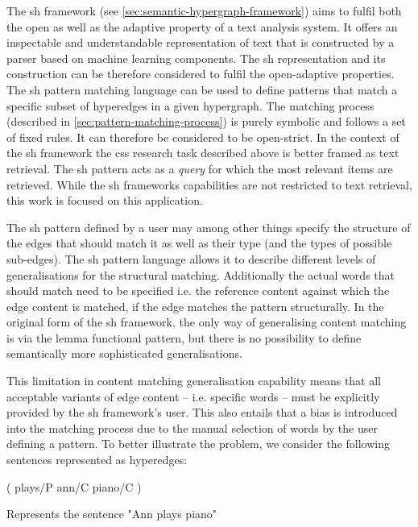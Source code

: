 \documentclass[11pt, numbers=noenddot]{scrreprt}
\begin{document}
The \gls{sh} framework (see \cref{sec:semantic-hypergraph-framework}) aims to fulfil both the open as well as the adaptive property of a text analysis system. It offers an inspectable and understandable representation of text that is constructed by a parser based on machine learning components. The \gls{sh} representation and its construction can be therefore considered to fulfil the open-adaptive properties. The \gls{sh} pattern matching language can be used to define patterns that match a specific subset of hyperedges in a given hypergraph. The matching process (described in \cref{sec:pattern-matching-process}) is purely symbolic and follows a set of fixed rules. It can therefore be considered to be open-strict. In the context of the \gls{sh} framework the \gls{css} research task described above is better framed as text retrieval. The \gls{sh} pattern acts  as a \textit{query} for which the most relevant items are retrieved. While the \gls{sh} frameworks capabilities are not restricted to text retrieval, this work is focused on this application.

The \gls{sh} pattern defined by a user may among other things specify the structure of the edges that should match it as well as their type (and the types of possible sub-edges). The \gls{sh} pattern language allows it to describe different levels of generalisations for the structural matching. Additionally the actual words that should match need to be specified i.e. the reference content against which the edge content is matched, if the edge matches the pattern structurally. In the original form of the \gls{sh} framework, the only way of generalising content matching is via the lemma functional pattern, but there is no possibility to define semantically more sophisticated generalisations.

This limitation in content matching generalisation capability means that all acceptable variants of edge content -- i.e. specific words -- must be explicitly provided by the \gls{sh} framework's user. This also entails that a bias is introduced into the matching process due to the manual selection of words by the user defining a pattern. To better illustrate the problem, we consider the following sentences represented as hyperedges:

\begin{hedge}[h!]
  \normalfont\sffamily
  \centering
  ( plays/P ann/C piano/C ) 
  \caption{Represents the sentence "Ann plays piano"}
  \label{hed:ann-plays-piano}
\end{hedge}
\end{document}

